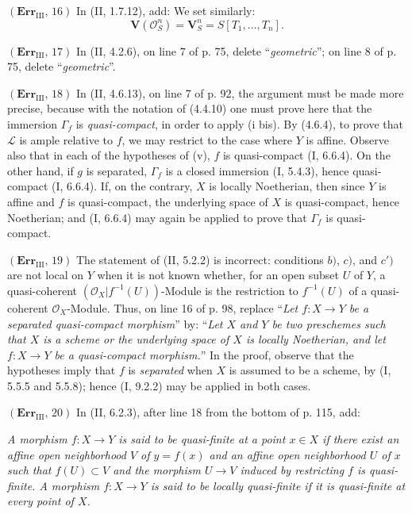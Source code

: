 \documentclass[10pt,oneside]{book}
\newcommand{\sh}[1]{\mathscr{#1}}
\newcommand{\oldpage}[2][]{\setcounter{footnote}{0}\marginpar{\scriptsize\textbf{#1}~|~#2}\ignorespaces}
\begin{document}
\noindent\textbf{$(\mathbf{Err}_{\mathrm{III}},\,16)$} In (II, 1.7.12), add:
We set similarly:
\[
  \mathbf V(\sh{O}_S^n)=\mathbf V_S^n=S[T_1,\ldots,T_n].
\]

\noindent\textbf{$(\mathbf{Err}_{\mathrm{III}},\,17)$} In (II, 4.2.6), on
line 7 of p. 75, delete ``\emph{geometric}''; on line 8 of p. 75, delete
``\emph{geometric}''.

\noindent\textbf{$(\mathbf{Err}_{\mathrm{III}},\,18)$} In (II, 4.6.13), on
line 7 of p. 92, the argument must be made more precise, because with the
notation of (4.4.10) one must prove here that the immersion $\Gamma_f$ is
\emph{quasi-compact}, in order to apply (i bis). By (4.6.4), to prove that
$\sh{L}$ is ample relative to $f$, we may restrict to the case where $Y$ is
affine. Observe also that in each of the hypotheses of (v), $f$ is
quasi-compact (I, 6.6.4). On the other hand, if $g$ is
\oldpage[III]{221}
separated, $\Gamma_f$ is a closed immersion (I, 5.4.3), hence quasi-compact
(I, 6.6.4). If, on the contrary, $X$ is locally Noetherian, then since $Y$ is
affine and $f$ is quasi-compact, the underlying space of $X$ is quasi-compact,
hence Noetherian; and (I, 6.6.4) may again be applied to prove that $\Gamma_f$
is quasi-compact.

\noindent\textbf{$(\mathbf{Err}_{\mathrm{III}},\,19)$} The statement of (II,
5.2.2) is incorrect: conditions $b)$, $c)$, and $c')$ are not local on $Y$
when it is not known whether, for an open subset $U$ of $Y$, a quasi-coherent
$(\sh{O}_X|f^{-1}(U))$-Module is the restriction to $f^{-1}(U)$ of a
quasi-coherent $\sh{O}_X$-Module. Thus, on line 16 of p. 98, replace
``\emph{Let $f:X\to Y$ be a separated quasi-compact morphism}'' by:
``\emph{Let $X$ and $Y$ be two preschemes such that $X$ is a scheme or the
underlying space of $X$ is locally Noetherian, and let $f:X\to Y$ be a
quasi-compact morphism.}'' In the proof, observe that the hypotheses imply
that $f$ is \emph{separated} when $X$ is assumed to be a scheme, by (I, 5.5.5
and 5.5.8); hence (I, 9.2.2) may be applied in both cases.

\noindent\textbf{$(\mathbf{Err}_{\mathrm{III}},\,20)$} In (II, 6.2.3), after
line 18 from the bottom of p. 115, add:

\emph{A morphism $f:X\to Y$ is said to be quasi-finite at a point $x\in X$ if
there exist an affine open neighborhood $V$ of $y=f(x)$ and an affine open
neighborhood $U$ of $x$ such that $f(U)\subset V$ and the morphism $U\to V$
induced by restricting $f$ is quasi-finite. A morphism $f:X\to Y$ is said to
be locally quasi-finite if it is quasi-finite at every point of $X$.}
\end{document}
